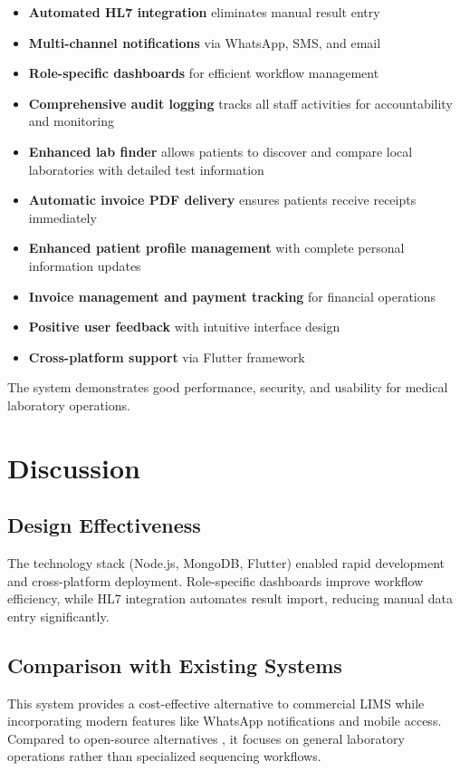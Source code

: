 \documentclass[12pt, a4paper]{report}
\begin{document}
\begin{itemize}
    \item \textbf{Automated HL7 integration} eliminates manual result entry
    \item \textbf{Multi-channel notifications} via WhatsApp, SMS, and email
    \item \textbf{Role-specific dashboards} for efficient workflow management
    \item \textbf{Comprehensive audit logging} tracks all staff activities for accountability and monitoring    \item \textbf{Enhanced lab finder} allows patients to discover and compare local laboratories with detailed test information    \item \textbf{Automatic invoice PDF delivery} ensures patients receive receipts immediately
    \item \textbf{Enhanced patient profile management} with complete personal information updates
    \item \textbf{Invoice management and payment tracking} for financial operations
    \item \textbf{Positive user feedback} with intuitive interface design
    \item \textbf{Cross-platform support} via Flutter framework
\end{itemize}

The system demonstrates good performance, security, and usability for medical laboratory operations.

\chapter{Discussion}
\section{Design Effectiveness}
The technology stack (Node.js, MongoDB, Flutter) enabled rapid development and cross-platform deployment. Role-specific dashboards improve workflow efficiency, while HL7 integration automates result import, reducing manual data entry significantly.

\section{Comparison with Existing Systems}
This system provides a cost-effective alternative to commercial LIMS while incorporating modern features like WhatsApp notifications and mobile access. Compared to open-source alternatives \cite{miso-lims, iskylims, metalims}, it focuses on general laboratory operations rather than specialized sequencing workflows.
\end{document}
